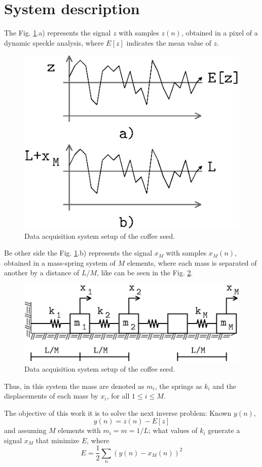 \documentclass[review]{elsarticle}
\begin{document}
\section{System description}
The Fig. \ref{fig:system2}.a) represents the signal $z$ with samples $z(n)$, 
obtained  in a pixel of a dynamic speckle analysis,
where $E[z]$ indicates the mean value of $z$. 
\begin{figure}[ht!]
\centering
\includegraphics[width=0.55\columnwidth]{images/system-mass-spring-2.eps}
\caption{Data acquisition system setup of the coffee seed.  }
\label{fig:system2}
\end{figure}
Be other side the 
Fig. \ref{fig:system2}.b) represents the signal $x_M$ with samples $x_{M}(n)$, 
obtained  in a mass-spring system of $M$ elements, where each mass
is separated of another by a distance of $L/M$, like can be seen in the
Fig. \ref{fig:system}.
\begin{figure}[ht!]
\centering
\includegraphics[width=0.95\columnwidth]{images/system-mass-spring.eps}
\caption{Data acquisition system setup of the coffee seed.  }
\label{fig:system}
\end{figure}
Thus, in this system the mass are denoted as $m_i$, the springs as $k_i$ and the
displacements of each mass by $x_i$, for all $1 \leq  i\leq M$.

The objective of this work it is to solve the next inverse problem: Known $y(n)$, 
\begin{equation}\label{eq:yn}
 y(n)=z(n)-E[z]
\end{equation} 
and assuming
$M$ elements with $m_i=m=1/L$; what values of $k_i$ generate a signal $x_M$ that minimize $E$, 
where
\begin{equation}\label{eq:inverseproblem}
 E=\frac{1}{2}\sum_{n} (y(n)-x_M(n))^2
\end{equation} 
\end{document}
